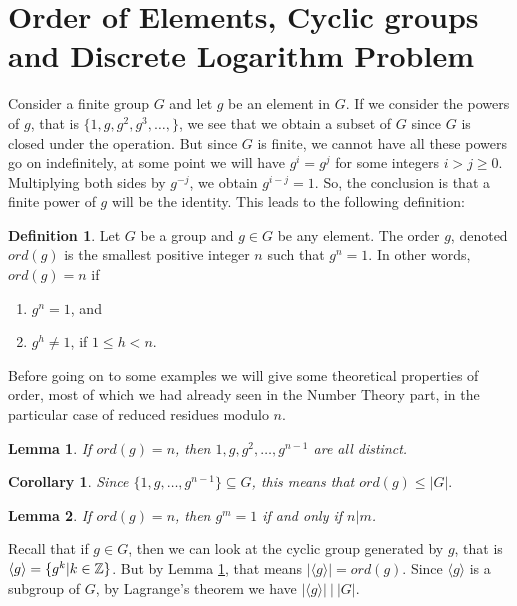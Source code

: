 \documentclass[12pt]{article}
\theoremstyle{plain}
\newtheorem{corollary}{Corollary}
\newtheorem{lemma}{Lemma}
\theoremstyle{definition}
\newtheorem{definition}{Definition}
\theoremstyle{remark}
\begin{document}
\section{Order of Elements, Cyclic groups and Discrete Logarithm Problem}
Consider a finite group $G$ and let $g$ be an element in $G$. If we consider the powers of $g$, that is 
$\{1, g, g^2, g^3, \dots, \}$, we see that we obtain a subset of $G$ since $G$ is closed under the operation. 
But since $G$ is finite, we cannot have all these powers go on indefinitely, at some point we will have $g^i=g^j$ for some integers $i>j\geq 0$. Multiplying both sides by $g^{-j}$, we obtain $g^{i-j}=1$. So, the conclusion is that a finite power of $g$ will be the identity. This leads to the following definition:
\begin{definition}
Let $G$ be a group and $g\in G$ be any element. The order $g$, denoted $ord(g)$ is the smallest positive integer $n$ such that $g^n=1$. In other words, $ord(g)=n$ if 
\begin{enumerate}
    \item $g^n=1$, and 
    \item $g^h\neq 1$, if $1\leq h <n$.
\end{enumerate}
\end{definition}
Before going on to some examples we will give some theoretical properties of order, most of which we had already seen in the Number Theory part, in the particular case of reduced residues modulo $n$.

\begin{lemma}\label{1}
If $ord(g) = n$, then $1, g, g^2, \dots, g^{n-1}$ are all distinct. 
\end{lemma}

\begin{corollary}
Since $\{1,g, \dots, g^{n-1}\} \subseteq G$, this means that $ord(g)\leq |G|.$
\end{corollary}

\begin{lemma}
If $ord(g)=n$, then $g^m=1$ if and only if $n|m$. 
\end{lemma}

Recall that if $g\in G$, then we can look at the cyclic group generated by $g$, that is $\langle g\rangle = \{g^k|k\in \mathbb{Z}\}$. But by Lemma \ref{1}, that means $|\langle g\rangle|  = ord(g)$. Since $\langle g \rangle$ is a subgroup of $G$, by Lagrange's theorem we have $|\langle g \rangle | \: | \: |G|$.
\end{document}
